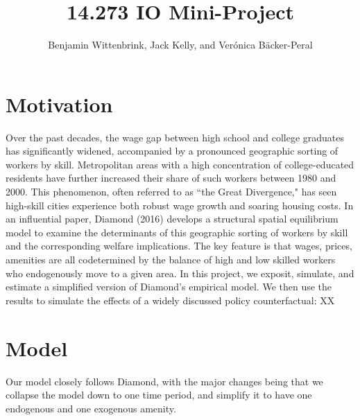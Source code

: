 \documentclass{article}
\title{\vspace{-2.5cm}14.273 IO Mini-Project}
\author{Benjamin Wittenbrink, Jack Kelly, and Verónica Bäcker-Peral}
\begin{document}
\maketitle

\section{Motivation}

Over the past decades, the wage gap between high school and college graduates has significantly widened, accompanied by a pronounced geographic sorting of workers by skill. Metropolitan areas with a high concentration of college-educated residents have further increased their share of such workers between 1980 and 2000. This phenomenon, often referred to as ``the Great Divergence," has seen high-skill cities experience both robust wage growth and soaring housing costs. In an influential paper, Diamond (2016) develops a structural spatial equilibrium model to examine the determinants of this geographic sorting of workers by skill and the corresponding welfare implications. The key feature is that wages, prices, amenities are all codetermined by the balance of high and low skilled workers who endogenously move to a given area. In this project, we exposit, simulate, and estimate a simplified version of Diamond's empirical model. We then use the results to simulate the effects of a widely discussed policy counterfactual: XX



\section{Model}

Our model closely follows Diamond, with the major changes being that we collapse the model down to one time period, and simplify it to have one endogenous and one exogenous amenity. 
\end{document}
